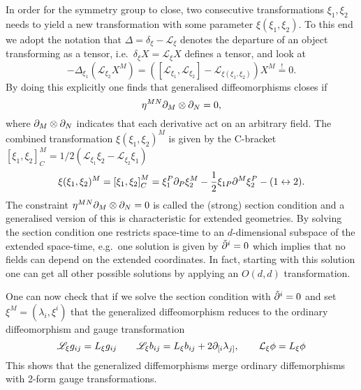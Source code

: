 In order for the symmetry group to close, two consecutive transformations $\xi_1,\xi_2$ needs to yield a new transformation with some parameter $\xi(\xi_1,\xi_2)$. To this end we adopt the notation that $\Delta=\delta_\xi-\mathscr{L}_\xi$ denotes the departure of an object transforming as a tensor, i.e.\ $\delta_\xi X = \mathscr{L}_\xi X$ defines a tensor, and look at 
\begin{equation}
    -\Delta_{\xi_1}(\mathscr{L}_{\xi_2} X^M) = \left(\left[\mathscr{L}_{\xi_1},\mathscr{L}_{\xi_2}\right]-\mathscr{L}_{\xi(\xi_1,\xi_2)}\right)X^M \overset{!}{=} 0.
\end{equation}
By doing this explicitly one finds that generalised diffeomorphisms closes if 
\begin{equation}
    \eta^{MN}\partial_M\otimes\partial_N = 0,
\end{equation}
where $\partial_M \otimes \partial_N$ indicates that each derivative act on an arbitrary field. The combined transformation $\xi(\xi_1,\xi_2)^M$ is given by the C-bracket $\left[\xi_1,\xi_2\right]_C^M = 1/2(\mathcal{L}_{\xi_1}\xi_2-\mathcal{L}_{\xi_2}\xi_1)$
\begin{equation}
    \xi(\xi_1,\xi_2)^M = \left[\xi_1,\xi_2\right]_C^M = \xi_1^P\partial_P\xi_2^M-\frac{1}{2}\xi_{1P}\partial^M\xi^P_2-(1\leftrightarrow 2).
\end{equation}
The constraint $\eta^{MN}\partial_M\otimes\partial_N=0$ is called the (strong) section condition and a generalised version of this is characteristic for extended geometries. By solving the section condition one restricts space-time to an $d$-dimensional subspace of the extended space-time, e.g.\ one solution is given by $\tilde{\partial}^i=0$ which implies that no fields can depend on the extended coordinates. In fact, starting with this solution one can get all other possible solutions by applying an $O(d,d)$ transformation. 

One can now check that if we solve the section condition with $\tilde{\partial}^i=0$ and set $\xi^M = (\lambda_i,\xi^i)$ that the generalized diffeomorphism reduces to the ordinary diffeomorphism and gauge transformation 
\begin{equation}
    \mathscr{L}_\xi g_{ij} = L_\xi g_{ij} \qquad \mathscr{L}_\xi b_{ij} = L_\xi b_{ij}+2\partial_{[i}\lambda_{j]}, \qquad \mathcal{L}_\xi \phi = L_\xi\phi
\end{equation}
This shows that the generalized diffemorphisms merge ordinary diffemorphisms with 2-form gauge transformations. 




